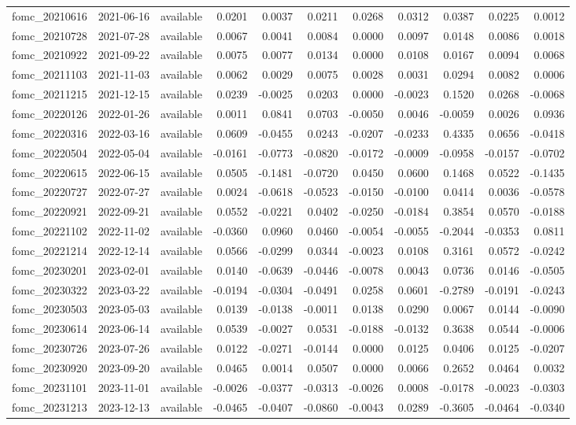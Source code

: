 \begin{tabular}{lllrrrrrrrr}
fomc_20210616 & 2021-06-16 & available & 0.0201 & 0.0037 & 0.0211 & 0.0268 & 0.0312 & 0.0387 & 0.0225 & 0.0012 \\
fomc_20210728 & 2021-07-28 & available & 0.0067 & 0.0041 & 0.0084 & 0.0000 & 0.0097 & 0.0148 & 0.0086 & 0.0018 \\
fomc_20210922 & 2021-09-22 & available & 0.0075 & 0.0077 & 0.0134 & 0.0000 & 0.0108 & 0.0167 & 0.0094 & 0.0068 \\
fomc_20211103 & 2021-11-03 & available & 0.0062 & 0.0029 & 0.0075 & 0.0028 & 0.0031 & 0.0294 & 0.0082 & 0.0006 \\
fomc_20211215 & 2021-12-15 & available & 0.0239 & -0.0025 & 0.0203 & 0.0000 & -0.0023 & 0.1520 & 0.0268 & -0.0068 \\
fomc_20220126 & 2022-01-26 & available & 0.0011 & 0.0841 & 0.0703 & -0.0050 & 0.0046 & -0.0059 & 0.0026 & 0.0936 \\
fomc_20220316 & 2022-03-16 & available & 0.0609 & -0.0455 & 0.0243 & -0.0207 & -0.0233 & 0.4335 & 0.0656 & -0.0418 \\
fomc_20220504 & 2022-05-04 & available & -0.0161 & -0.0773 & -0.0820 & -0.0172 & -0.0009 & -0.0958 & -0.0157 & -0.0702 \\
fomc_20220615 & 2022-06-15 & available & 0.0505 & -0.1481 & -0.0720 & 0.0450 & 0.0600 & 0.1468 & 0.0522 & -0.1435 \\
fomc_20220727 & 2022-07-27 & available & 0.0024 & -0.0618 & -0.0523 & -0.0150 & -0.0100 & 0.0414 & 0.0036 & -0.0578 \\
fomc_20220921 & 2022-09-21 & available & 0.0552 & -0.0221 & 0.0402 & -0.0250 & -0.0184 & 0.3854 & 0.0570 & -0.0188 \\
fomc_20221102 & 2022-11-02 & available & -0.0360 & 0.0960 & 0.0460 & -0.0054 & -0.0055 & -0.2044 & -0.0353 & 0.0811 \\
fomc_20221214 & 2022-12-14 & available & 0.0566 & -0.0299 & 0.0344 & -0.0023 & 0.0108 & 0.3161 & 0.0572 & -0.0242 \\
fomc_20230201 & 2023-02-01 & available & 0.0140 & -0.0639 & -0.0446 & -0.0078 & 0.0043 & 0.0736 & 0.0146 & -0.0505 \\
fomc_20230322 & 2023-03-22 & available & -0.0194 & -0.0304 & -0.0491 & 0.0258 & 0.0601 & -0.2789 & -0.0191 & -0.0243 \\
fomc_20230503 & 2023-05-03 & available & 0.0139 & -0.0138 & -0.0011 & 0.0138 & 0.0290 & 0.0067 & 0.0144 & -0.0090 \\
fomc_20230614 & 2023-06-14 & available & 0.0539 & -0.0027 & 0.0531 & -0.0188 & -0.0132 & 0.3638 & 0.0544 & -0.0006 \\
fomc_20230726 & 2023-07-26 & available & 0.0122 & -0.0271 & -0.0144 & 0.0000 & 0.0125 & 0.0406 & 0.0125 & -0.0207 \\
fomc_20230920 & 2023-09-20 & available & 0.0465 & 0.0014 & 0.0507 & 0.0000 & 0.0066 & 0.2652 & 0.0464 & 0.0032 \\
fomc_20231101 & 2023-11-01 & available & -0.0026 & -0.0377 & -0.0313 & -0.0026 & 0.0008 & -0.0178 & -0.0023 & -0.0303 \\
fomc_20231213 & 2023-12-13 & available & -0.0465 & -0.0407 & -0.0860 & -0.0043 & 0.0289 & -0.3605 & -0.0464 & -0.0340 \\
\bottomrule
\end{tabular}
